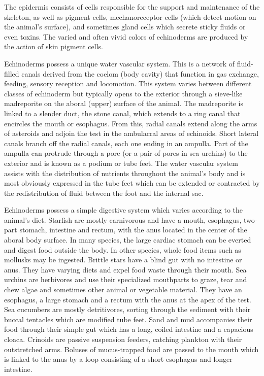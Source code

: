 The epidermis consists of cells responsible for the support and
maintenance of the skeleton, as well as pigment cells, mechanoreceptor
cells (which detect motion on the animal's surface), and sometimes gland
cells which secrete sticky fluids or even toxins. The varied and often
vivid colors of echinoderms are produced by the action of skin pigment
cells.

Echinoderms possess a unique water vascular system. This is a network of
fluid-filled canals derived from the coelom (body cavity) that function
in gas exchange, feeding, sensory reception and locomotion. This system
varies between different classes of echinoderm but typically opens to
the exterior through a sieve-like madreporite on the aboral (upper)
surface of the animal. The madreporite is linked to a slender duct, the
stone canal, which extends to a ring canal that encircles the mouth or
esophagus. From this, radial canals extend along the arms of asteroids
and adjoin the test in the ambulacral areas of echinoids. Short lateral
canals branch off the radial canals, each one ending in an ampulla. Part
of the ampulla can protrude through a pore (or a pair of pores in sea
urchins) to the exterior and is known as a podium or tube feet. The
water vascular system assists with the distribution of nutrients
throughout the animal's body and is most obviously expressed in the tube
feet which can be extended or contracted by the redistribution of fluid
between the foot and the internal sac.

Echinoderms possess a simple digestive system which varies according to
the animal's diet. Starfish are mostly carnivorous and have a mouth,
esophagus, two-part stomach, intestine and rectum, with the anus located
in the center of the aboral body surface. In many species, the large
cardiac stomach can be everted and digest food outside the body. In
other species, whole food items such as mollusks may be ingested.
Brittle stars have a blind gut with no intestine or anus. They have
varying diets and expel food waste through their mouth. Sea urchins are
herbivores and use their specialized mouthparts to graze, tear and chew
algae and sometimes other animal or vegetable material. They have an
esophagus, a large stomach and a rectum with the anus at the apex of the
test. Sea cucumbers are mostly detritivores, sorting through the
sediment with their buccal tentacles which are modified tube feet. Sand
and mud accompanies their food through their simple gut which has a
long, coiled intestine and a capacious cloaca. Crinoids are passive
suspension feeders, catching plankton with their outstretched arms.
Boluses of mucus-trapped food are passed to the mouth which is linked to
the anus by a loop consisting of a short esophagus and longer intestine.

